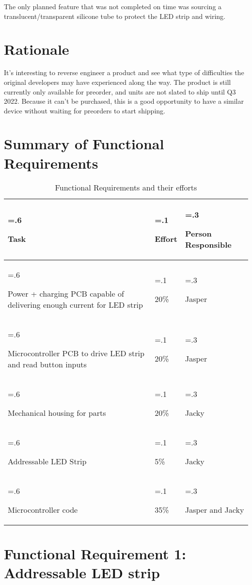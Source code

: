 \documentclass{notes}
\begin{document}
The only planned feature that was not completed on time was sourcing a translucent/transparent silicone tube to protect the LED strip and wiring.

\section{Rationale}

It's interesting to reverse engineer a product and see what type of difficulties the original developers may have experienced along the way.
The product is still currently only available for preorder, and units are not slated to ship until Q3 2022.
Because it can't be purchased, this is a good opportunity to have a similar device without waiting for preorders to start shipping.

\section{Summary of Functional Requirements}

\begin{table}[H]
    \centering
    \begin{tabularx}{\textwidth}{>{\hsize=.6\hsize\raggedright}X>{\hsize=.1\hsize\raggedright}X>{\hsize=.3\hsize\raggedright\arraybackslash}X}
        Task                                                                    & Effort & Person Responsible \\\toprule
        Power + charging PCB capable of delivering enough current for LED strip & 20\%   & Jasper             \\\midrule
        Microcontroller PCB to drive LED strip and read button inputs           & 20\%   & Jasper             \\\midrule
        Mechanical housing for parts                                            & 20\%   & Jacky              \\\midrule
        Addressable LED Strip                                                   & 5\%    & Jacky              \\ \midrule
        Microcontroller code                                                    & 35\%   & Jasper and Jacky   \\\bottomrule
    \end{tabularx}
    \caption{Functional Requirements and their efforts}
    \label{tab:funcreq}
\end{table}

\section{Functional Requirement 1: Addressable LED strip}
\end{document}
